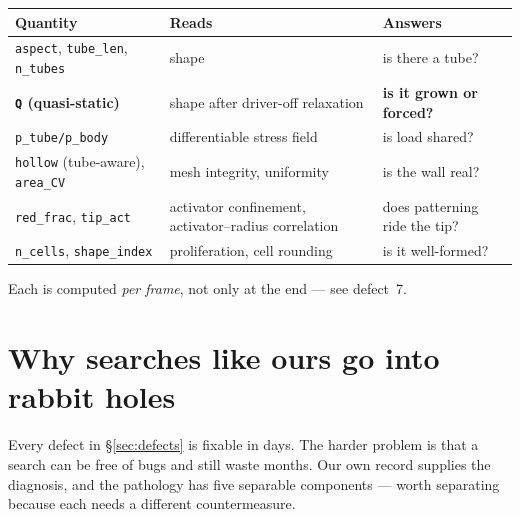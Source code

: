 \documentclass[11pt]{article}
\newcommand{\code}[1]{\texttt{#1}}
\begin{document}
\begin{center}\small
\begin{tabular}{@{}lll@{}}
\toprule
\textbf{Quantity} & \textbf{Reads} & \textbf{Answers} \\
\midrule
\code{aspect}, \code{tube\_len}, \code{n\_tubes} & shape & is there a tube? \\
\textbf{\code{Q} (quasi-static)} & shape after driver-off relaxation & \textbf{is it grown or forced?} \\
\code{p\_tube/p\_body} & differentiable stress field & is load shared? \\
\code{hollow} (tube-aware), \code{area\_CV} & mesh integrity, uniformity & is the wall real? \\
\code{red\_frac}, \code{tip\_act} & activator confinement, activator--radius correlation & does patterning ride the tip? \\
\code{n\_cells}, \code{shape\_index} & proliferation, cell rounding & is it well-formed? \\
\bottomrule
\end{tabular}
\end{center}

Each is computed \emph{per frame}, not only at the end --- see defect~7.

\section{Why searches like ours go into rabbit holes}
\label{sec:rabbit}

Every defect in \S\ref{sec:defects} is fixable in days. The harder problem is that a search can be
free of bugs and still waste months. Our own record supplies the diagnosis, and the pathology has
five separable components --- worth separating because each needs a different countermeasure.
\end{document}
